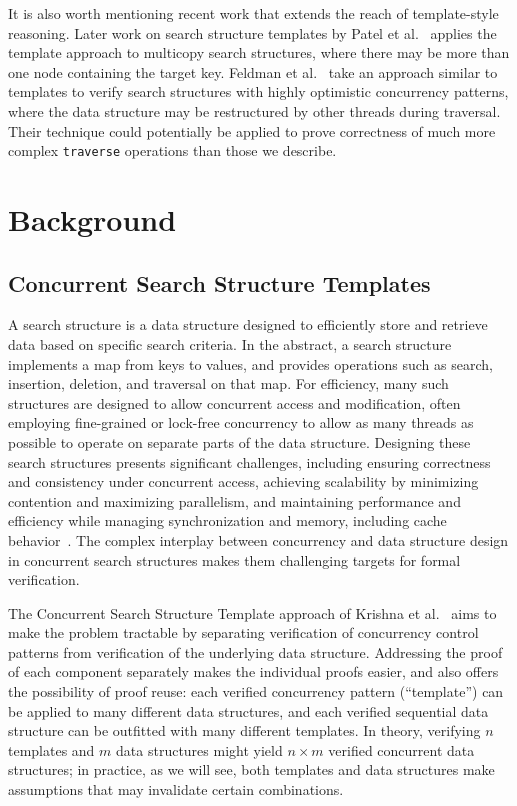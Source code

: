 \documentclass[a4paper,UKenglish,cleveref, autoref, thm-restate]{lipics-v2021}
\begin{document}

It is also worth mentioning recent work that extends the reach of template-style reasoning. Later work on search structure templates by Patel et al.~\cite{template-multi} applies the template approach to multicopy search structures, where there may be more than one node containing the target key. Feldman et al.~\cite{feldman2020proving} take an approach similar to templates to verify search structures with highly optimistic concurrency patterns, where the data structure may be restructured by other threads during traversal. Their technique could potentially be applied to prove correctness of much more complex \lstinline{traverse} operations than those we describe.

\section{Background}
\subsection{Concurrent Search Structure Templates}

A search structure is a data structure designed to efficiently store and retrieve data based on specific search criteria. In the abstract, a search structure implements a map from keys to values, and provides operations such as search, insertion, deletion, and traversal on that map. For efficiency, many such structures are designed to allow concurrent access and modification, often employing fine-grained or lock-free concurrency to allow as many threads as possible to operate on separate parts of the data structure. Designing these search structures presents significant challenges, including ensuring correctness and consistency under concurrent access, achieving scalability by minimizing contention and maximizing parallelism, and maintaining performance and efficiency while managing synchronization and memory, including cache behavior~\cite{masstree}. The complex interplay between concurrency and data structure design in concurrent search structures makes them challenging targets for formal verification.

The Concurrent Search Structure Template approach of Krishna et al.~\cite{templates} aims to make the problem tractable by separating verification of concurrency control patterns from verification of the underlying data structure. Addressing the proof of each component separately makes the individual proofs easier, and also offers the possibility of proof reuse: each verified concurrency pattern (``template'') can be applied to many different data structures, and each verified sequential data structure can be outfitted with many different templates. In theory, verifying $n$ templates and $m$ data structures might yield $n \times m$ verified concurrent data structures; in practice, as we will see, both templates and data structures make assumptions that may invalidate certain combinations. %
\end{document}
